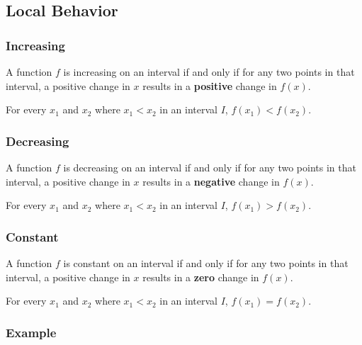 \documentclass{article}
\begin{document}
\subsection{Local Behavior}

\subsubsection*{Increasing}

A function $f$ is increasing on an interval if and only if for any two points in that interval, a positive change in $x$ results in a \textbf{positive} change in $f(x)$.

For every $x_{1}$ and $x_{2}$ where $x_{1} < x_{2}$ in an interval $I$, $f(x_{1}) < f(x_{2})$.

\subsubsection*{Decreasing}

A function $f$ is decreasing on an interval if and only if for any two points in that interval, a positive change in $x$ results in a \textbf{negative} change in $f(x)$.

For every $x_{1}$ and $x_{2}$ where $x_{1} < x_{2}$ in an interval $I$, $f(x_{1}) > f(x_{2})$.

\subsubsection*{Constant}

A function $f$ is constant on an interval if and only if for any two points in that interval, a positive change in $x$ results in a \textbf{zero} change in $f(x)$.

For every $x_{1}$ and $x_{2}$ where $x_{1} < x_{2}$ in an interval $I$, $f(x_{1}) = f(x_{2})$.

\subsubsection*{Example}

\begin{center}
\end{center}
\end{document}
